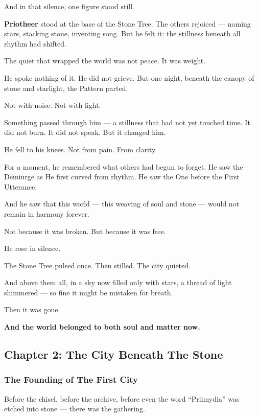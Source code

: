 \documentclass[12pt]{article}
\begin{document}
And in that silence, one figure stood still.

\textbf{Priotheer} stood at the base of the Stone Tree.  
The others rejoiced — naming stars, stacking stone, inventing song.  
But he felt it:  
the stillness beneath all rhythm had shifted.

The quiet that wrapped the world was not peace.  
It was weight.

He spoke nothing of it.  
He did not grieve.  
But one night, beneath the canopy of stone and starlight,  
the Pattern parted.

Not with noise.  
Not with light.

Something passed through him —  
a stillness that had not yet touched time.  
It did not burn.  
It did not speak.  
But it changed him.

He fell to his knees.  
Not from pain.  
From clarity.

For a moment,  
he remembered what others had begun to forget.  
He saw the Demiurge as He first curved from rhythm.  
He saw the One before the First Utterance.

And he saw that this world —  
this weaving of soul and stone —  
would not remain in harmony forever.

Not because it was broken.  
But because it was free.

He rose in silence.

The Stone Tree pulsed once. Then stilled.  
The city quieted.

And above them all, in a sky now filled only with stars,  
a thread of light shimmered —  
so fine it might be mistaken for breath.

Then it was gone.

\textbf{And the world belonged to both soul and matter now.}

\newpage

\subsection{Chapter 2: The City Beneath The Stone}

\vspace{.5in}

\subsubsection{The Founding of The First City}

Before the chisel, before the archive, before even the word “Priimydia” was etched into stone — there was the gathering.
\end{document}
